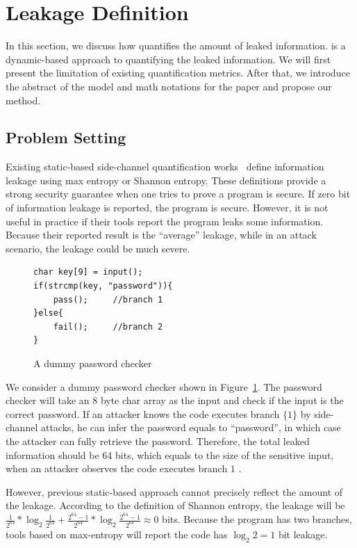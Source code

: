 \section{\tool{} Leakage Definition}
\label{sec:trace-qif}
In this section, we discuss how \tool{} quantifies the amount of leaked
information. \tool{} is a dynamic-based approach to quantifying the leaked
information. We will first present the limitation of existing quantification
metrics. After that, we introduce the abstract of the model and math notations
for the paper and propose our method.

\subsection{Problem Setting}
Existing static-based side-channel quantification
works~\cite{182946,Wichelmann:2018:MFF:3274694.3274741 } define information
leakage using max entropy or Shannon entropy. These definitions provide a strong
security guarantee when one tries to prove a program is secure.  If zero bit of
information leakage is reported, the program is secure. However, it is not
useful in practice if their tools report the program leaks some information. Because
their reported result is the ``average'' leakage, while in an attack scenario, the
leakage could be much severe.


\begin{figure}[h!]
    \centering
    \begin{lstlisting}[xleftmargin=.03\textwidth,xrightmargin=.01\textwidth]
char key[9] = input();
if(strcmp(key, "password")){
    pass();     //branch 1
}else{
    fail();     //branch 2
}
\end{lstlisting}
    \caption{A dummy password checker}
    \label{fig:password-checker}
\end{figure}

We consider a dummy password checker shown in Figure~\ref{fig:password-checker}.
The password checker will take an 8 byte char array as the input and check if the
input is the correct password. If an attacker knows the code executes branch
$\{{1\}}$ by side-channel attacks, he can infer the password equals to ``password'', in
which case the attacker can fully retrieve the password. Therefore, the total leaked
information should be 64 bits, which equals to the size of the sensitive
input, when an attacker observes the code executes branch $1$ .

However, previous static-based approach cannot precisely reflect the amount of
the leakage. According to the definition of Shannon entropy, the leakage will be
$\frac{1}{2^{64}}*\log_{2}\frac{1}{2^{64}} + \frac{2^{64}-1}{2^{64}} *\log_{2}\frac{2^{64}-1}{2^{64}} \approx
0$ bits. Because the program has two branches, tools based on max-entropy
will report the code has $\log_2{2} = 1$ bit leakage.

